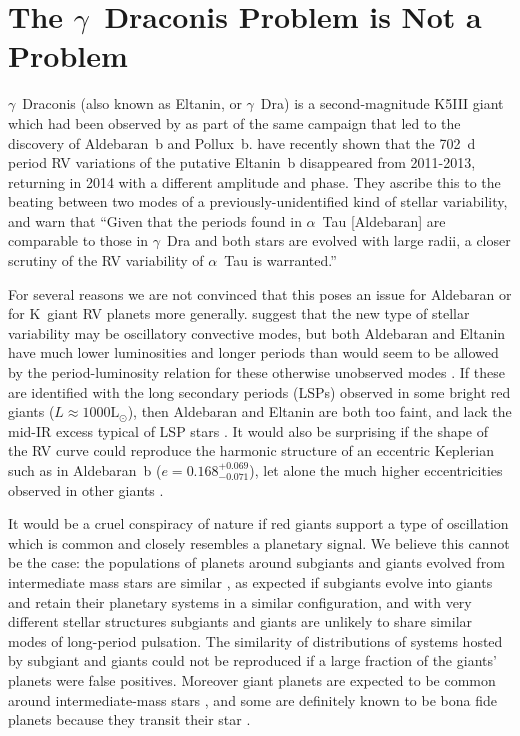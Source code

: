 \documentclass[modern]{aastex61}
\newcommand{\lsun}{\mbox{$\mathrm{L}_{\odot}$}\xspace}
\newcommand{\twosidedrange}[3]{\ensuremath{#1^{+#2}_{-#3}}}
\newcommand{\EccentricityRange}{\twosidedrange{0.168}{0.069}{0.071}}
\begin{document}
\section{The $\gamma$~Draconis Problem is Not a Problem}
\label{gamma_dra}

$\gamma$~Draconis (also known as Eltanin, or $\gamma$~Dra) is a second-magnitude K5III giant which had been observed by \citet{hatzes1993} as part of the same campaign that led to the discovery of Aldebaran~b and Pollux~b. \citet{2018arXiv180105239H} have recently shown that the 702~d period RV variations of the putative Eltanin~b disappeared from 2011-2013, returning in 2014 with a different amplitude and phase. They ascribe this to the beating between two modes of a previously-unidentified kind of stellar variability, and warn that ``Given that the periods found in $\alpha$~Tau [Aldebaran] are comparable to those in $\gamma$~Dra and both stars are evolved with large radii, a closer scrutiny of the RV variability of $\alpha$~Tau is warranted.''

For several reasons we are not convinced that this poses an issue for Aldebaran or for K~giant RV planets more generally. \citet{2018arXiv180105239H} suggest that the new type of stellar variability may be oscillatory convective modes, but both Aldebaran and Eltanin have much lower luminosities and longer periods than would seem to be allowed by the period-luminosity relation for these otherwise unobserved modes \citep[Figure~9]{2015MNRAS.452.3863S,2018arXiv180105239H}. If these are identified with the long secondary periods (LSPs) observed in some bright red giants ($L \approx 1000 \lsun$), then Aldebaran and Eltanin are both too faint, and lack the mid-IR excess typical of LSP stars \citep{2009ApJ...707..573W}. It would also be surprising if the shape of the RV curve could reproduce the harmonic structure of an eccentric Keplerian such as in Aldebaran~b ($e = \EccentricityRange{}$), let alone the much higher eccentricities observed in other giants \citep[e.g. $\iota$~Dra~b, $e=0.7$:][]{2002ApJ...576..478F}.

It would be a cruel conspiracy of nature if red giants support a type of oscillation which is common and closely resembles a planetary signal. We believe this cannot be the case: the populations of planets around subgiants and giants evolved from intermediate mass stars are similar \citep{2014A&A...566A.113J}, as expected if subgiants evolve into giants and retain their planetary systems in a similar configuration, and with very different stellar structures subgiants and giants are unlikely to share similar modes of long-period pulsation. The similarity of distributions of systems hosted by subgiant and giants could not be reproduced if a large fraction of the giants' planets were false positives. Moreover giant planets are expected to be common around intermediate-mass stars \citep{2008ApJ...673..502K}, and some are definitely known to be bona fide planets because they transit their star \citep[e.g.][]{2014A&A...562A.109L,2015A&A...573L...6O,2016AJ....152..185G,2017AJ....154..254G}. 
\end{document}
